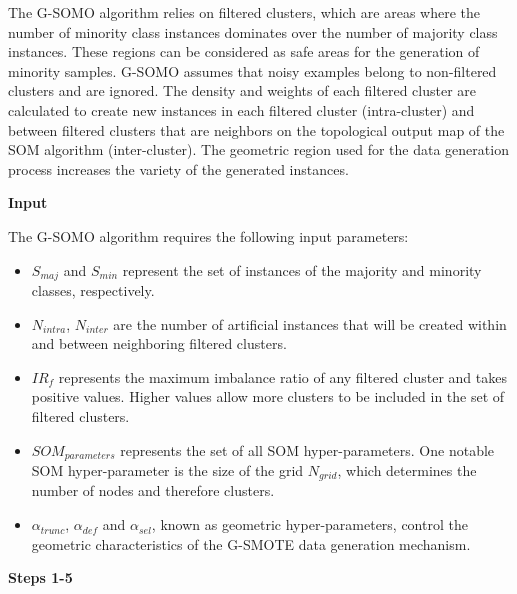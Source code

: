 \documentclass[parskip=full]{scrartcl}
\begin{document}
The G-SOMO algorithm relies on filtered clusters, which are areas where the number of minority class instances dominates over the number of majority class instances. These regions can be considered as safe areas for the generation of minority samples. G-SOMO assumes that noisy examples belong to non-filtered clusters and are ignored. The density and weights of each filtered cluster are calculated to create new instances in each filtered cluster (intra-cluster) and between filtered clusters that are neighbors on the topological output map of the SOM algorithm (inter-cluster). The geometric region used for the data generation process increases the variety of the generated instances.

\textbf{Input}

The G-SOMO algorithm requires the following input parameters:

\begin{itemize}

	\renewcommand\labelitemi{--}

	\item $S_{maj}$ and $S_{min}$ represent the set of instances of the majority and minority classes, respectively.

	\item $N_{intra}$, $N_{inter}$ are the number of artificial instances that will be created within and between neighboring filtered clusters.

	\item $IR_{f}$ represents the maximum imbalance ratio of any filtered cluster and takes positive values. Higher values allow more clusters to be included in the set of filtered clusters.

	\item $SOM_{parameters}$ represents the set of all SOM hyper-parameters. One notable SOM hyper-parameter is the size of the grid $N_{grid}$, which determines the number of nodes and therefore clusters.

	\item $\alpha_{trunc}$, $\alpha_{def}$ and $\alpha_{sel}$, known as geometric hyper-parameters, control the geometric characteristics of the G-SMOTE data generation mechanism.

\end{itemize}

\textbf{Steps 1-5}
\end{document}
